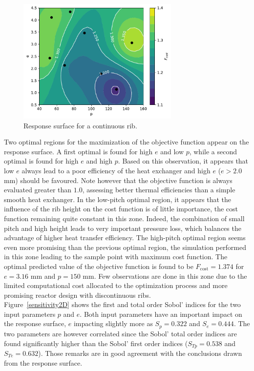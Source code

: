 \begin{figure}[h]
\centering
\includegraphics[width=8cm]{fig/applications/optim/GP_continuous.pdf}
\caption{Response surface for a continuous rib.}
\label{continuous_RS}
\end{figure}

Two optimal regions for the maximization of the objective function appear on the response surface. A first optimal is found for high $e$ and low $p$, while a second optimal is found for high $e$ and high $p$. Based on this observation, it appears that low $e$ always lead to a poor efficiency of the heat exchanger and high $e$ ($e > 2.0$ mm) should be favoured. Note however that the objective function is always evaluated greater than $1.0$, assessing better thermal efficiencies than a simple smooth heat exchanger. In the low-pitch optimal region, it appears that the influence of the rib height on the cost function is of little importance, the cost function remaining quite constant in this zone. Indeed, the combination of small pitch and high height leads to very important pressure loss, which balances the advantage of higher heat transfer efficiency. The high-pitch optimal region seems even more promising than the previous optimal region, the simulation performed in this zone leading to the sample point with maximum cost function. The optimal predicted value of the objective function is found to be $F_{\text{cost}} = 1.374$ for $e = 3.16$ mm and $p = 150$ mm. Few observations are done in this zone due to the limited computational cost allocated to the optimization process and more promising reactor design with discontinuous ribs.\\

Figure~\ref{sensitivity2D} shows the first and total order Sobol' indices for the two input parameters $p$ and $e$. Both input parameters have an important impact on the response surface, $e$ impacting slightly more as $S_p = 0.322$ and $S_e = 0.444$. The two parameters are however correlated since the Sobol' total order indices are found significantly higher than the Sobol' first order indices ($S_{Tp} = 0.538$ and $S_{Te} = 0.632$). Those remarks are in good agreement with the conclusions drawn from the response surface. 

